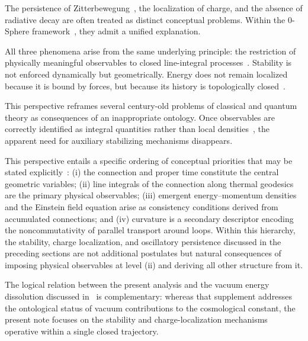 \documentclass[12pt,a4paper]{article}
\begin{document}
\justifying

The persistence of Zitterbewegung~\cite{schrodinger1930,hanamura18356895}, the localization of charge, and the absence of radiative decay are often treated as distinct conceptual problems. Within the 0-Sphere framework~\cite{hanamura16759284}, they admit a unified explanation.

All three phenomena arise from the same underlying principle: the restriction of physically meaningful observables to closed line-integral processes~\cite{aharonov1959,berry1984,hanamura17765409,hanamura18275142,hanamura18203433}. Stability is not enforced dynamically but geometrically. Energy does not remain localized because it is bound by forces, but because its history is topologically closed~\cite{hanamura18275142}.

This perspective reframes several century-old problems of classical and quantum theory as consequences of an inappropriate ontology. Once observables are correctly identified as integral quantities rather than local densities~\cite{hanamura18067760,hanamura18135855,hanamura18203433}, the apparent need for auxiliary stabilizing mechanisms disappears.

This perspective entails a specific ordering of conceptual priorities that may be stated explicitly~\cite{hanamura18203433}: (i) the connection and proper time constitute the central geometric variables; (ii) line integrals of the connection along thermal geodesics are the primary physical observables; (iii) emergent energy--momentum densities and the Einstein field equation arise as consistency conditions derived from accumulated connections; and (iv) curvature is a secondary descriptor encoding the noncommutativity of parallel transport around loops. Within this hierarchy, the stability, charge localization, and oscillatory persistence discussed in the preceding sections are not additional postulates but natural consequences of imposing physical observables at level (ii) and deriving all other structure from it.

The logical relation between the present analysis and the vacuum energy dissolution discussed in~\cite{hanamura18727981} is complementary: whereas that supplement addresses the ontological status of vacuum contributions to the cosmological constant, the present note focuses on the stability and charge-localization mechanisms operative within a single closed trajectory.

\end{document}
